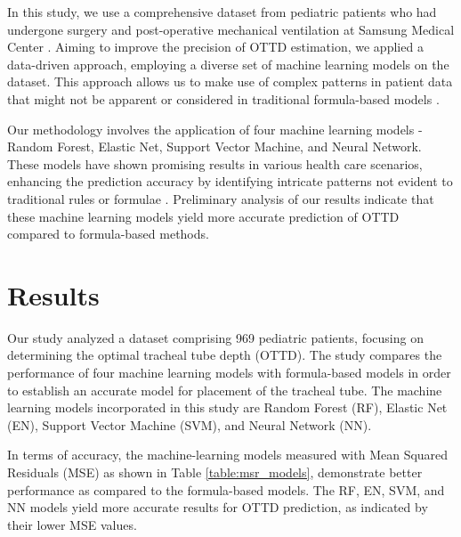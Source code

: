 \documentclass[11pt]{article}
\begin{document}
In this study, we use a comprehensive dataset from pediatric patients who had undergone surgery and post-operative mechanical ventilation at Samsung Medical Center \cite{Ingelse2017EarlyFO}. Aiming to improve the precision of OTTD estimation, we applied a data-driven approach, employing a diverse set of machine learning models on the dataset. This approach allows us to make use of complex patterns in patient data that might not be apparent or considered in traditional formula-based models \cite{Christian2020UseAO}.

Our methodology involves the application of four machine learning models - Random Forest, Elastic Net, Support Vector Machine, and Neural Network. These models have shown promising results in various health care scenarios, enhancing the prediction accuracy by identifying intricate patterns not evident to traditional rules or formulae \cite{Cheng2016RiskPW, Rajkomar2018ScalableAA}. Preliminary analysis of our results indicate that these machine learning models yield more accurate prediction of OTTD compared to formula-based methods.

\section*{Results}

Our study analyzed a dataset comprising 969 pediatric patients, focusing on determining the optimal tracheal tube depth (OTTD). The study compares the performance of four machine learning models with formula-based models in order to establish an accurate model for placement of the tracheal tube. The machine learning models incorporated in this study are Random Forest (RF), Elastic Net (EN), Support Vector Machine (SVM), and Neural Network (NN).

In terms of accuracy, the machine-learning models measured with Mean Squared Residuals (MSE) as shown in Table \ref{table:msr_models}, demonstrate better performance as compared to the formula-based models. The RF, EN, SVM, and NN models yield more accurate results for OTTD prediction, as indicated by their lower MSE values.
\end{document}
